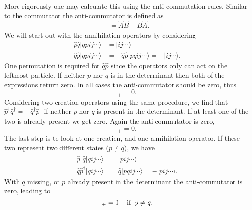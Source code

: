 \paragraph*{}
More rigorously one may calculate this using the anti-commutation rules. Similar to the commutator the anti-commutator is defined as 
\begin{equation}
[\hat{A},\hat{B}]_+ = \hat{A} \hat{B} + \hat{B} \hat{A} .
\end{equation}
We will start out with the annihilation operators by considering 
\begin{equation}
\begin{split}
\hat{p}\hat{q} | qpij\cdots \rangle &= |ij\cdots \rangle
\\
\hat{q}\hat{p} | qpij\cdots \rangle &= - \hat{q}\hat{p} | pqij\cdots \rangle = - | ij\cdots \rangle .
\end{split}
\end{equation}
One permutation is required for $\hat{q}\hat{p}$ since the operators only can act on the leftmost particle.
If neither $p$ nor $q$ is in the determinant then both of the expressions return zero.
In all cases the anti-commutator should be zero, thus
\begin{equation}
[\hat{p},\hat{q}]_+ = 0 .
\end{equation}
Considering two creation operators using the same procedure, we find that
$\hat{p}^{\dagger} \hat{q}^{\dagger} = - \hat{q}^{\dagger} \hat{p}^{\dagger}$
if neither $p$ nor $q$ is present in the determinant. If at least one of the
two is already present we get zero. Again the anti-commutator is zero, 
\begin{equation}
[\hat{p}^{\dagger},\hat{q}^{\dagger}]_+ = 0 .
\end{equation}
The last step is to look at one creation, and one annihilation operator.
If these two represent two different states ($p \neq q$), we have
\begin{equation}
\begin{split}
\hat{p}^{\dagger} \hat{q} |q ij\cdots \rangle &= |pij\cdots \rangle
\\
\hat{q} \hat{p}^{\dagger} |q ij\cdots \rangle &= 
\hat{q} |pqij\cdots \rangle = - |pij\cdots \rangle .
\end{split}
\end{equation}
With $q$ missing, or $p$ already present in the determinant the anti-commutator is zero, leading to 
\begin{equation}
[\hat{p}^{\dagger},\hat{q}]_+ = 0 \hspace{3mm}\textrm{ if }\hspace{1mm} p \neq q .
\end{equation}
